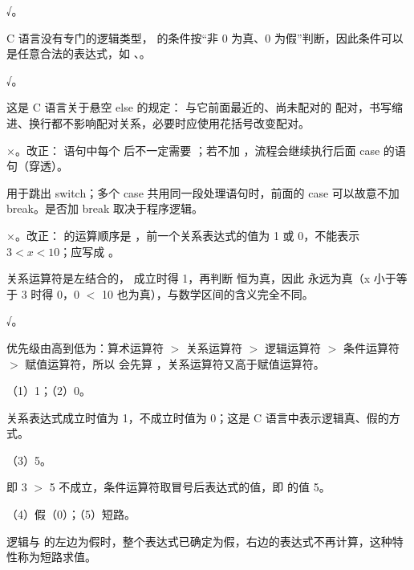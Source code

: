 \documentclass[a4paper,11pt]{article}
\begin{document}

\q √。\begin{analysis}C 语言没有专门的逻辑类型， 的条件按“非 0 为真、0 为假”判断，因此条件可以是任意合法的表达式，如 、。\end{analysis}

\q √。\begin{analysis}这是 C 语言关于悬空 else 的规定： 与它前面最近的、尚未配对的  配对，书写缩进、换行都不影响配对关系，必要时应使用花括号改变配对。\end{analysis}

\q ×。改正： 语句中每个  后不一定需要 ；若不加 ，流程会继续执行后面 case 的语句（穿透）。\begin{analysis} 用于跳出 switch；多个 case 共用同一段处理语句时，前面的 case 可以故意不加 break。是否加 break 取决于程序逻辑。\end{analysis}

\q ×。改正： 的运算顺序是 ，前一个关系表达式的值为 1 或 0，不能表示 $3<x<10$；应写成 。\begin{analysis}关系运算符是左结合的， 成立时得 1，再判断  恒为真，因此  永远为真（x 小于等于 3 时得 0，0 $<$ 10 也为真），与数学区间的含义完全不同。\end{analysis}

\q √。\begin{analysis}优先级由高到低为：算术运算符 $>$ 关系运算符 $>$ 逻辑运算符 $>$ 条件运算符 $>$ 赋值运算符，所以  会先算 ，关系运算符又高于赋值运算符。\end{analysis}


\q （1）1；（2）0。\begin{analysis}关系表达式成立时值为 1，不成立时值为 0；这是 C 语言中表示逻辑真、假的方式。\end{analysis}

\q （3）5。\begin{analysis} 即 3 $>$ 5 不成立，条件运算符取冒号后表达式的值，即  的值 5。\end{analysis}

\q （4）假（0）；（5）短路。\begin{analysis}逻辑与 \code{\&\&} 的左边为假时，整个表达式已确定为假，右边的表达式不再计算，这种特性称为短路求值。\end{analysis}
\end{document}
